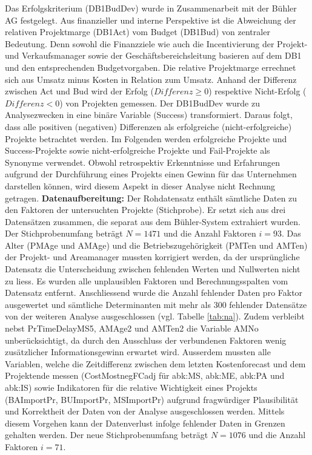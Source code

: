 \newline Das Erfolgskriterium (DB1BudDev) wurde in Zusammenarbeit mit der Bühler AG festgelegt. Aus finanzieller und interne Perspektive ist die Abweichung der relativen Projektmarge (DB1Act) vom Budget (DB1Bud) von zentraler Bedeutung. Denn sowohl die Finanzziele wie auch die Incentivierung der Projekt- und Verkaufsmanager sowie der Geschäftsbereichsleitung basieren auf dem DB1 und den entsprechenden Budgetvorgaben. Die relative Projektmarge errechnet sich aus Umsatz minus Kosten in Relation zum Umsatz. Anhand der Differenz zwischen Act und Bud wird der Erfolg ($Differenz \geq 0$) respektive Nicht-Erfolg ($Differenz < 0$) von Projekten gemessen. Der DB1BudDev wurde zu Analysezwecken in eine binäre Variable (Success) transformiert. Daraus folgt, dass alle positiven (negativen) Differenzen als erfolgreiche (nicht-erfolgreiche) Projekte betrachtet werden. Im Folgenden werden erfolgreiche Projekte und Success-Projekte sowie nicht-erfolgreiche Projekte und Fail-Projekte als Synonyme verwendet. Obwohl retrospektiv Erkenntnisse und Erfahrungen aufgrund der Durchführung eines Projekts einen Gewinn für das Unternehmen darstellen können, wird diesem Aspekt in dieser Analyse nicht Rechnung getragen.
\newline\newline\textbf{Datenaufbereitung:} Der Rohdatensatz enthält sämtliche Daten zu den Faktoren der untersuchten Projekte (Stichprobe). Er setzt sich aus drei Datensätzen zusammen, die separat aus dem Bühler-System extrahiert wurden. Der Stichprobenumfang beträgt $N = 1471$ und die Anzahl Faktoren $i = 93$. Das Alter (PMAge und AMAge) und die Betriebszugehörigkeit (PMTen und AMTen) der Projekt- und Areamanager mussten korrigiert werden, da der ursprüngliche Datensatz die Unterscheidung zwischen fehlenden Werten und Nullwerten nicht zu liess.
\newline
Es wurden alle unplausiblen Faktoren und Berechnungsspalten vom Datensatz entfernt. Anschliessend wurde die Anzahl fehlender Daten pro Faktor ausgewertet und sämtliche Determinanten mit mehr als 300 fehlender Datensätze von der weiteren Analyse ausgeschlossen (vgl. Tabelle \ref{tab:na}). Zudem verbleibt nebst PrTimeDelayMS5, AMAge2 und AMTen2 die Variable AMNo unberücksichtigt, da durch den Ausschluss der verbundenen Faktoren wenig zusätzlicher Informationsgewinn erwartet wird. Ausserdem mussten alle Variablen, welche die Zeitdifferenz zwischen dem letzten Kostenforecast und dem Projektende messen (CostMostnegFCadj für \gls{abk:MS}, \gls{abk:ME}, \gls{abk:PA} und \gls{abk:IS}) sowie Indikatoren für die relative Wichtigkeit eines Projekts (BAImportPr, BUImportPr, MSImportPr) aufgrund fragwürdiger Plausibilität und Korrektheit der Daten von der Analyse ausgeschlossen werden. Mittels diesem Vorgehen kann der Datenverlust infolge fehlender Daten in Grenzen gehalten werden. Der neue Stichprobenumfang beträgt $N = 1076$ und die Anzahl Faktoren $i = 71$.
